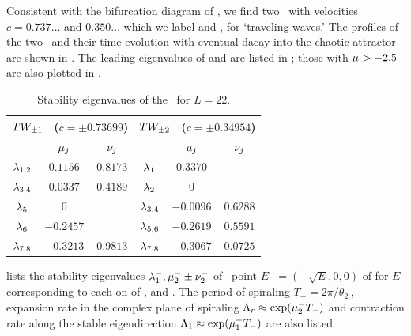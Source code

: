 Consistent with the bifurcation diagram of
,
we find two \reqva\ with velocities
$c = 0.737\ldots$ and $0.350\ldots$
which we
label  and ,
for `traveling waves.'
The profiles of the two \reqva\ and their time evolution
with eventual dacay into the chaotic attractor are
shown in .  The leading eigenvalues of
 and  are listed in ;
those with $\eigRe> -2.5$ are also plotted in
.
\begin{table} \label{tab:TW}
\caption{
Stability eigenvalues of the \reqva\ for $L=22$.
} %
\begin{center} \footnotesize
\begin{tabular}{ccc|ccc}
  \multicolumn{3}{c}{$\REQV{\pm}{1}$ ~($c = \pm 0.73699$)}  &
  \multicolumn{3}{c}{$\REQV{\pm}{2}$ ~($c = \pm 0.34954$)} \\\hline
  &$\eigRe[j]$ & $\eigIm[j]$ & & $\eigRe[j]$ & $\eigIm[j]$\\
  $\eigExp[1,2]$ & $0.1156$ & $0.8173$ & $\eigExp[1]  $ & $0.3370$ & \\
  $\eigExp[3,4]$ & $0.0337$ & $0.4189$ & $\eigExp[2]  $ & $0$ & \\
  $\eigExp[5]$   & $0$      &          & $\eigExp[3,4]$ &$-0.0096$ & $0.6288$\\
  $\eigExp[6]$   &$-0.2457$ &          & $\eigExp[5,6]$ &$-0.2619$ & $0.5591$\\
  $\eigExp[7,8]$ &$-0.3213$ & $0.9813$ & $\eigExp[7,8]$ &$-0.3067$ & $0.0725$\\
\end{tabular}
\end{center}
\end{table}



 lists the stability eigenvalues
$\eigExp[1]^-,\eigRe[2]^-\pm\eigIm[2]^-$
of \eqv\ point $E_{-}=(-\sqrt{E},0,0)$
of  for $E$ corresponding to each on of , 
 and  \eqva.
The period of spiraling $T_{-}=2\pi/\theta^-_2$, expansion
rate in the complex plane of spiraling
$\ExpaEig_r\approx\exp(\eigRe[2]^- T_-)$ and contraction
rate along the stable eigendirection
$\ExpaEig_1\approx\exp(\eigRe[1]^- T_-)$ are also listed.


